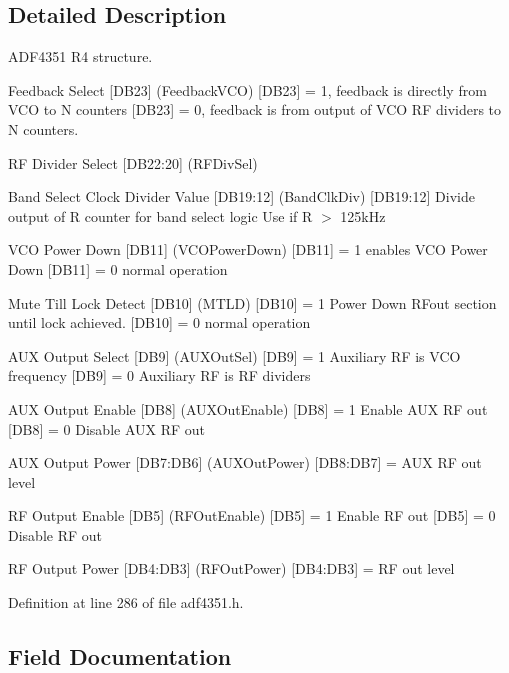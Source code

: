 \subsection{Detailed Description}
A\+D\+F4351 R4 structure. 

Feedback Select \mbox{[}D\+B23\mbox{]} (Feedback\+V\+CO) \mbox{[}D\+B23\mbox{]} = 1, feedback is directly from V\+CO to N counters \mbox{[}D\+B23\mbox{]} = 0, feedback is from output of V\+CO RF dividers to N counters.

RF Divider Select \mbox{[}D\+B22\+:20\mbox{]} (R\+F\+Div\+Sel)

Band Select Clock Divider Value \mbox{[}D\+B19\+:12\mbox{]} (Band\+Clk\+Div) \mbox{[}D\+B19\+:12\mbox{]} Divide output of R counter for band select logic Use if R $>$ 125k\+Hz

V\+CO Power Down \mbox{[}D\+B11\mbox{]} (V\+C\+O\+Power\+Down) \mbox{[}D\+B11\mbox{]} = 1 enables V\+CO Power Down \mbox{[}D\+B11\mbox{]} = 0 normal operation

Mute Till Lock Detect \mbox{[}D\+B10\mbox{]} (M\+T\+LD) \mbox{[}D\+B10\mbox{]} = 1 Power Down R\+Fout section until lock achieved. \mbox{[}D\+B10\mbox{]} = 0 normal operation

A\+UX Output Select \mbox{[}D\+B9\mbox{]} (A\+U\+X\+Out\+Sel) \mbox{[}D\+B9\mbox{]} = 1 Auxiliary RF is V\+CO frequency \mbox{[}D\+B9\mbox{]} = 0 Auxiliary RF is RF dividers

A\+UX Output Enable \mbox{[}D\+B8\mbox{]} (A\+U\+X\+Out\+Enable) \mbox{[}D\+B8\mbox{]} = 1 Enable A\+UX RF out \mbox{[}D\+B8\mbox{]} = 0 Disable A\+UX RF out

A\+UX Output Power \mbox{[}D\+B7\+:D\+B6\mbox{]} (A\+U\+X\+Out\+Power) \mbox{[}D\+B8\+:D\+B7\mbox{]} = A\+UX RF out level

RF Output Enable \mbox{[}D\+B5\mbox{]} (R\+F\+Out\+Enable) \mbox{[}D\+B5\mbox{]} = 1 Enable RF out \mbox{[}D\+B5\mbox{]} = 0 Disable RF out

RF Output Power \mbox{[}D\+B4\+:D\+B3\mbox{]} (R\+F\+Out\+Power) \mbox{[}D\+B4\+:D\+B3\mbox{]} = RF out level 

Definition at line 286 of file adf4351.\+h.



\subsection{Field Documentation}
